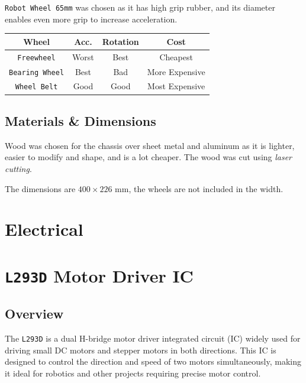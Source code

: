 \documentclass[a4paper,12pt]{article}
\begin{document}
\texttt{Robot Wheel 65mm} was chosen as it has high grip rubber, and its diameter enables even more grip to increase acceleration.

\begin{center}
    \bgroup
    \def\arraystretch{1.5}
    {
        \begin{tabular}{|c|c|c|c|}
            \hline
            \textbf{Wheel}         & \textbf{Acc.} & \textbf{Rotation} & \textbf{Cost}  \\
            \hline
            \texttt{Freewheel}     & Worst         & Best              & Cheapest       \\
            \hline
            \texttt{Bearing Wheel} & Best          & Bad               & More Expensive \\
            \hline
            \texttt{Wheel Belt}    & Good          & Good              & Most Expensive \\
            \hline
        \end{tabular}}
    \egroup
\end{center}

\subsection{Materials \& Dimensions}

Wood was chosen for the chassis over sheet metal and aluminum as it is lighter, easier to modify and shape, and is a lot cheaper. The wood was cut using \textit{laser cutting}.

The dimensions are $400 \times 226$ mm, the wheels are not included in the width.

\section{Electrical}
\section*{\texttt{L293D} Motor Driver IC}

\subsection{Overview}
The \texttt{L293D} is a dual H-bridge motor driver integrated circuit (IC) widely used for driving small DC motors and stepper motors in both directions. This IC is designed to control the direction and speed of two motors simultaneously, making it ideal for robotics and other projects requiring precise motor control.
\end{document}
